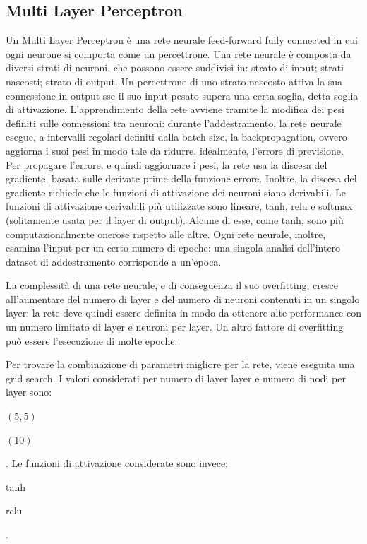 \subsection{Multi Layer Perceptron}
Un Multi Layer Perceptron è una rete neurale feed-forward fully connected in cui 
ogni neurone si comporta come un percettrone. Una rete neurale è composta
da diversi strati di neuroni, che possono essere suddivisi in: strato di input;
strati nascosti; strato di output.
Un percettrone di uno strato nascosto attiva la sua connessione in output
sse il suo input pesato supera una certa soglia, detta soglia di attivazione.
L'apprendimento della rete avviene tramite la modifica dei pesi definiti
sulle connessioni tra neuroni: durante l'addestramento, la rete neurale esegue,
a intervalli regolari definiti dalla batch size, la backpropagation, ovvero
aggiorna i suoi pesi in modo tale da ridurre, idealmente, l'errore di previsione.
Per propagare l'errore, e quindi aggiornare i pesi, la rete usa la discesa del
gradiente, basata sulle derivate prime della funzione errore. Inoltre,
la discesa del gradiente richiede che le funzioni di attivazione dei neuroni
siano derivabili.
Le funzioni di attivazione derivabili più utilizzate sono lineare, tanh, relu
e softmax (solitamente usata per il layer di output). Alcune di esse, come tanh,
sono più computazionalmente onerose rispetto alle altre.
Ogni rete neurale, inoltre, esamina l'input per un certo numero di epoche:
una singola analisi dell'intero dataset di addestramento corrisponde a un'epoca.

La complessità di una rete neurale, e di conseguenza il suo overfitting, cresce
all'aumentare del numero di layer e del numero di neuroni contenuti in un
singolo layer: la rete deve quindi
essere definita in modo da ottenere alte performance con un numero limitato
di layer e neuroni per layer.
Un altro fattore di overfitting può essere l'esecuzione di molte epoche.

Per trovare la combinazione di parametri migliore per la rete, viene eseguita 
una grid search. 
I valori considerati per numero di layer layer e numero di nodi per layer sono:
\begin{itemize*}
    \item $(5, 5)$
    \item $(10)$
\end{itemize*}.
Le funzioni di attivazione considerate sono invece: \begin{itemize*}
    \item tanh
    \item relu
\end{itemize*}.

